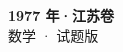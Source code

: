 \documentclass[zihao=-4, a4paper]{ctexart}
\begin{document}
\begin{center}
  {\Large\bfseries 1977 年·江苏卷}\\[4pt]
  {\large 数学 · 试题版}
\end{center}
\medskip
{}

\end{document}
